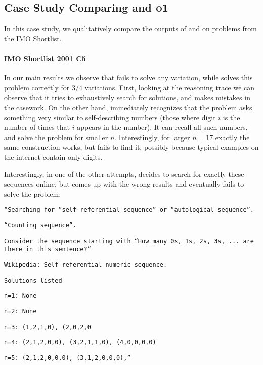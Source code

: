 \subsection{Case Study Comparing \geminithink{} and \textsc{o1}}
\label{app:case_study}
In this case study, we qualitatively compare the outputs of \geminithink{} and \oone{} on problems from the IMO Shortlist. 

\clearpage
\paragraph{IMO Shortlist 2001 C5}
In our main results we observe that \geminithink{} fails to solve any variation, while \oone{} solves this problem correctly for $3/4$ variations. First, looking at the \geminithink{} reasoning trace we can observe that it tries to exhaustively search for solutions, and makes mistakes in the casework. On the other hand, \oone{} immediately recognizes that the problem asks something very similar to self-describing numbers (those where digit $i$ is the number of times that $i$ appears in the number). It can recall all such numbers, and solve the problem for smaller $n$. Interestingly, for larger $n=17$ exactly the same construction works, but \oone{} fails to find it, possibly because typical examples on the internet contain only digits. 


\clearpage
Interestingly, in one of the other attempts, \geminithink{} decides to search for exactly these sequences online, but comes up with the wrong results and eventually fails to solve the problem:

\texttt{``Searching for ``self-referential sequence'' or ``autological sequence''.}

\texttt{``Counting sequence''.}

\texttt{Consider the sequence starting with ``How many 0s, 1s, 2s, 3s, ... are there in this sentence?''}

\texttt{Wikipedia: Self-referential numeric sequence.}

\texttt{Solutions listed}

\texttt{n=1: None}

\texttt{n=2: None}

\texttt{n=3: (1,2,1,0), (2,0,2,0}

\texttt{n=4: (2,1,2,0,0), (3,2,1,1,0), (4,0,0,0,0)}

\texttt{n=5: (2,1,2,0,0,0), (3,1,2,0,0,0),''}

